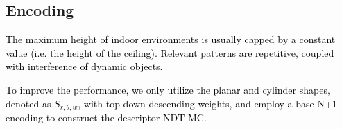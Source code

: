 \documentclass[letterpaper, 10 pt, conference]{ieeeconf}   %
\newcommand\kevin[1]{\textcolor{black}{#1}}
\begin{document}
\subsection{Encoding}




\kevin{The maximum height of indoor environments is usually capped by a constant value (i.e. the height of the ceiling). Relevant patterns are repetitive, coupled with interference of dynamic objects. }

\kevin{To improve the performance, we only utilize the planar and cylinder shapes, denoted as $S_{r,\theta,w}$, with top-down-descending weights, and employ a base N+1 encoding to construct the descriptor NDT-MC.}

\end{document}
